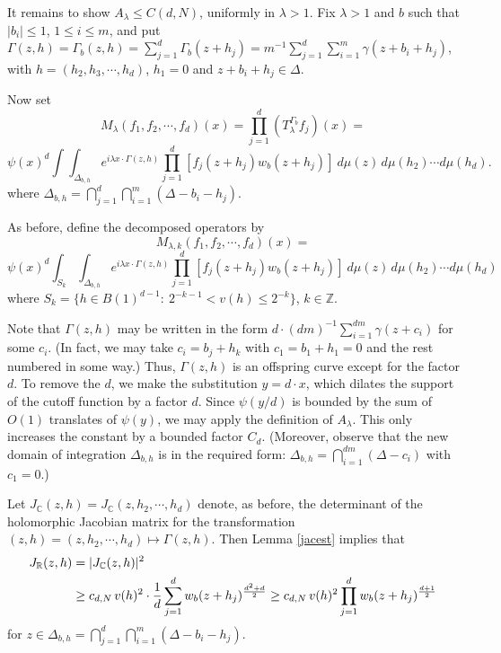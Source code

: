 \documentclass[11 pt]{amsart}
\theoremstyle{plain}
\numberwithin{equation}{section}
\theoremstyle{plain}
\numberwithin{equation}{section}
\theoremstyle{remark}
\begin{document}
It remains to show $A_{\lambda} \le C(d,N)$, uniformly in ${\lambda} >1$. Fix ${\lambda} >1$ and
$b$ such that $|b_i|\le 1$, $1\le i\le m$, and put $\Gamma(z,h) = \Gamma_b (z,h) = \sum_{j =1}^d \Gamma_b (z+h_j
) = m^{-1}\sum_{j =1}^d \sum_{i=1}^m \gamma(z+ b_i + h_j )$, with
$h=(h_2, h_3,\cdots,h_d )$, $h_1 = 0$ and $z+ b_i + h_j \in \Delta$.

Now set
\begin{equation*}\label{}
M_{\lambda} (f_1, f_2, \cdots, f_d)(x) = \prod_{j=1}^d (T_{\lambda}^{\Gamma_b}
f_j)(x) =
\end{equation*}
\begin{equation*}\label{}
\psi(x)^d \int \int_{\Delta_{b,h}} e^{i{\lambda} x\cdot
\Gamma(z,h)} \prod_{j=1}^d [f_j(z+ h_j) w_b(z+ h_j)]\ d\mu(z)\,
d\mu(h_2) \cdots d\mu(h_d) .
\end{equation*}
where $\Delta_{b,h} = \bigcap_{j=1}^d \bigcap_{i=1}^m(\Delta - b_i - h_j)$.

As before, define the decomposed operators by
\begin{equation*}\label{}
M_{{\lambda}, k} (f_1, f_2, \cdots ,f_d)(x) =
\end{equation*}
\begin{equation*}\label{}
\psi(x)^d \int_{S_k} \int_{\Delta_{b,h}} e^{i{\lambda} x\cdot
\Gamma(z,h)} \prod_{j=1}^d [f_j(z+ h_j) w_b (z+ h_j)]\ d\mu(z) \,
d\mu(h_2) \cdots d\mu(h_d)
\end{equation*}
where $S_k = {\{h\in B(1)^{d-1}:\ 2^{-k-1} < v(h) \le 2^{-k} \}}$, $k\in {{\mathbb {Z}}}$.

Note that $\Gamma(z,h)$ may be written in the form $d \cdot
(dm)^{-1} \sum_{i=1}^{dm} \gamma(z+ c_i)$ for some $c_i$. (In
fact, we may take $c_i = b_j+h_k$ with $c_1 = b_1 + h_1 =0$ and
the rest numbered in some way.) Thus, $\Gamma(z,h)$ is an
offspring curve except for the factor $d$. To remove the $d$, we make
the substitution $y=d \cdot x$, which dilates the support of the cutoff
function by a factor $d$. Since $\psi(y/d)$ is bounded by the sum of
$O(1)$ translates of $\psi(y)$, we may apply the definition of
$A_{\lambda}$. This only increases the constant by a bounded factor $C_d
$. (Moreover, observe that the new domain of
integration $\Delta_{b,h}$ is in the required form:
$\Delta_{b,h} = \bigcap_{i=1}^{dm} (\Delta - c_i)$ with $c_1 = 0$.)

\medskip

Let $J_{{\mathbb {C}}} (z, h) = J_{{\mathbb {C}}} (z, h_2,\cdots, h_d)$ denote, as before, the determinant of the holomorphic Jacobian matrix for the transformation $(z,h) = (z,h_2,\cdots, h_d) \mapsto \Gamma(z, h)$. Then Lemma \ref{jacest} implies that
\begin{align}\label{Jacobian-a-d}
J_{{\mathbb {R}}} (z, h) &= |J_{{\mathbb {C}}} (z, h)|^2\\ \notag
 &\ge c_{d,N} \, v(h)^2 \cdot {1\over d}\sum_{j=1}^d w_b (z+ h_j)^\frac{d^2+d}{2} \ge c_{d,N} \, v(h)^2 \prod_{j=1}^d w_b (z+ h_j)^\frac{d+1}{2}
\end{align}
for $z \in \Delta_{b,h} = \bigcap_{j=1}^d \bigcap_{i=1}^m(\Delta - b_i - h_j)$.
\end{document}
